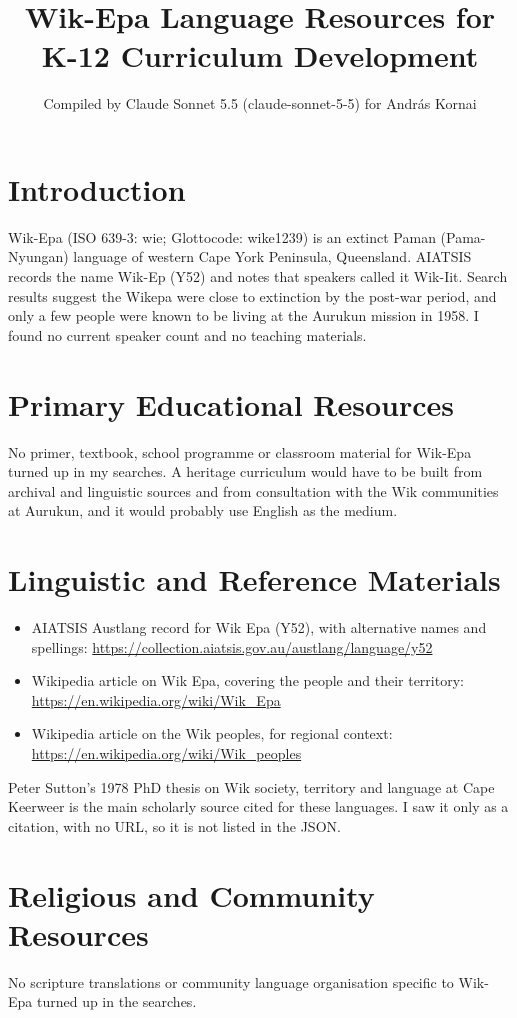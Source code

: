 \documentclass[12pt]{article}
\title{Wik-Epa Language Resources for K-12 Curriculum Development}
\author{Compiled by Claude Sonnet 5.5 (claude-sonnet-5-5) for Andr\'as Kornai}
\date{}
\begin{document}
\maketitle

\section{Introduction}
Wik-Epa (ISO 639-3: wie; Glottocode: wike1239) is an extinct Paman (Pama-Nyungan) language of western Cape York Peninsula, Queensland. AIATSIS records the name Wik-Ep (Y52) and notes that speakers called it Wik-Iit. Search results suggest the Wikepa were close to extinction by the post-war period, and only a few people were known to be living at the Aurukun mission in 1958. I found no current speaker count and no teaching materials.

\section{Primary Educational Resources}
No primer, textbook, school programme or classroom material for Wik-Epa turned up in my searches. A heritage curriculum would have to be built from archival and linguistic sources and from consultation with the Wik communities at Aurukun, and it would probably use English as the medium.

\section{Linguistic and Reference Materials}
\begin{itemize}
\item AIATSIS Austlang record for Wik Epa (Y52), with alternative names and spellings: \url{https://collection.aiatsis.gov.au/austlang/language/y52}
\item Wikipedia article on Wik Epa, covering the people and their territory: \url{https://en.wikipedia.org/wiki/Wik_Epa}
\item Wikipedia article on the Wik peoples, for regional context: \url{https://en.wikipedia.org/wiki/Wik_peoples}
\end{itemize}
Peter Sutton's 1978 PhD thesis on Wik society, territory and language at Cape Keerweer is the main scholarly source cited for these languages. I saw it only as a citation, with no URL, so it is not listed in the JSON.

\section{Religious and Community Resources}
No scripture translations or community language organisation specific to Wik-Epa turned up in the searches.
\end{document}
